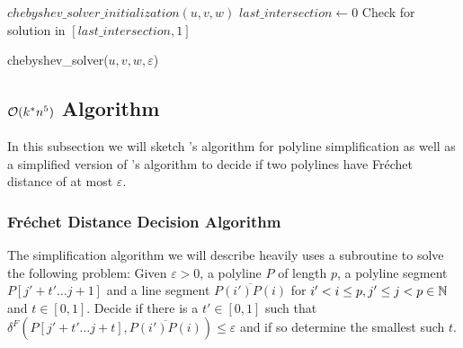 \begin{algorithm}[ht]
  \DontPrintSemicolon
  \BlankLine
  \(chebyshev\_solver\_initialization(u, v, w)\) \;
  \(last\_intersection \gets 0\) \;
  Check for solution in \([last\_intersection, 1]\) \;

  \caption{chebyshev\_solver(\(u, v, w, \varepsilon\))}
  \label{algo:solve_chebyshev}
  
\end{algorithm}

\subsection{\(\mathcal{O}(k^*n^5)\) Algorithm}
\label{subsec:simple_algo}

In this subsection we will sketch \citeauthor{on_optimal_polyline_simplification_using_the_hausdorff_and_frechet_distance}'s algorithm for polyline simplification as well as a simplified version of \citeauthor{computing_the_frechet_distance_between_two_polygonal_curves}'s algorithm to decide if two polylines have Fréchet distance of at most \(\varepsilon\). 

\subsubsection{Fréchet Distance Decision Algorithm}
\label{ssec:alt_godau}
The simplification algorithm we will describe heavily uses a subroutine to solve the following problem: Given \(\varepsilon > 0\), a polyline \(P \) of length \(p\), a polyline segment \(P[j' + t' \dots j+1]\) and a line segment \(\overline{P(i')P(i)}\) for \(i' < i \leq p, j' \leq j < p\in \mathbb{N}\) and \(t \in [0, 1]\). Decide if there is a \(t' \in [0, 1]\) such that \(\delta^F(P[j' + t' \dots j + t], \overline{P(i')P(i)}) \leq \varepsilon\) and if so determine the smallest such \(t\).  

